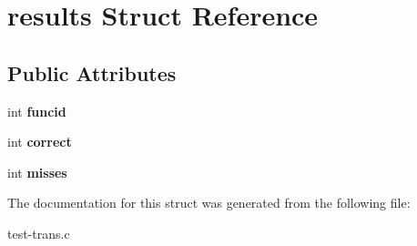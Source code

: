 \hypertarget{structresults}{}\section{results Struct Reference}
\label{structresults}
\subsection*{Public Attributes}
\begin{DoxyCompactItemize}
\item 
\mbox{\label{structresults_a29fb50c0e3f519767f2ca6f12642246b}} 
int {\bfseries funcid}
\item 
\mbox{\label{structresults_abcb7930a2dcfe8833818df2a9ccdd2af}} 
int {\bfseries correct}
\item 
\mbox{\label{structresults_a9d6d05947c2046b7799ec711563f45af}} 
int {\bfseries misses}
\end{DoxyCompactItemize}


The documentation for this struct was generated from the following file\+:\begin{DoxyCompactItemize}
\item 
test-\/trans.\+c\end{DoxyCompactItemize}
